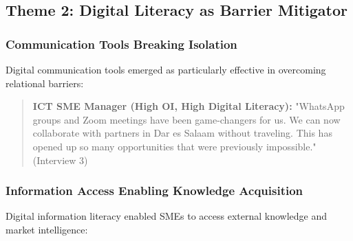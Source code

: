 \subsection{Theme 2: Digital Literacy as Barrier Mitigator}

\subsubsection{Communication Tools Breaking Isolation}
Digital communication tools emerged as particularly effective in overcoming relational barriers:

\begin{quote}
\textbf{ICT SME Manager (High OI, High Digital Literacy):} "WhatsApp groups and Zoom meetings have been game-changers for us. We can now collaborate with partners in Dar es Salaam without traveling. This has opened up so many opportunities that were previously impossible." (Interview 3)
\end{quote}

\subsubsection{Information Access Enabling Knowledge Acquisition}
Digital information literacy enabled SMEs to access external knowledge and market intelligence:


